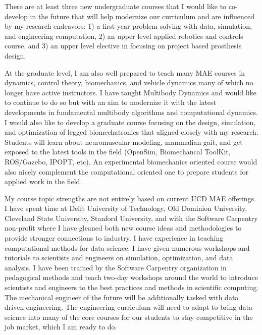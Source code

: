 \documentclass[titlepage]{article}
\begin{document}
There are at least three new undergraduate courses that I would like to
co-develop in the future that will help modernize our curriculum and are
influenced by my research endeavors: 1) a first year problem solving with data,
simulation, and engineering computation, 2) an upper level applied robotics and
controls course, and 3) an upper level elective in focusing on project based
prosthesis design.

At the graduate level, I am also well prepared to teach many MAE courses in
dynamics, control theory, biomechanics, and vehicle dynamics many of which no
longer have active instructors. I have taught Multibody Dynamics and would like
to continue to do so but with an aim to modernize it with the latest
developments in fundamental multibody algorithms and computational dynamics. I
would also like to develop a graduate course focusing on the design,
simulation, and optimization of legged biomechatronics that aligned closely
with my research. Students will learn about neuromuscular modeling, mammalian
gait, and get exposed to the latest tools in the field (OpenSim, Biomechancal
ToolKit, ROS/Gazebo, IPOPT, etc). An experimental biomechanics oriented course
would also nicely complement the computational oriented one to prepare students
for applied work in the field.

My course topic strengths are not entirely based on current UCD MAE offerings.
I have spent time at Delft University of Technology, Old Dominion University,
Cleveland State University, Stanford University, and with the Software
Carpentry non-profit where I have gleaned both new course ideas and
methodologies to provide stronger connections to industry. I have experience in
teaching computational methods for data science. I have given numerous
workshops and tutorials to scientists and engineers on simulation,
optimization, and data analysis. I have been trained by the Software Carpentry
organization in pedagogical methods and teach two-day workshops around the
world to introduce scientists and engineers to the best practices and methods
in scientific computing. The mechanical engineer of the future will be
additionally tasked with data driven engineering. The engineering curriculum
will need to adapt to bring data science into many of the core courses for our
students to stay competitive in the job market, which I am ready to do.
\end{document}
